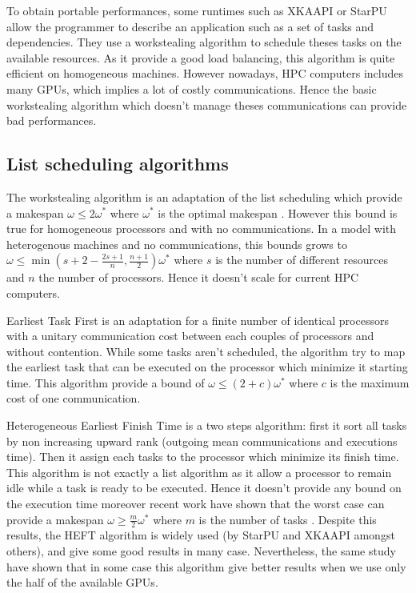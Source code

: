 \documentclass[10pt, conference, compsocconf,pdftex,usenames,dvipsnames]{IEEEtran}
\begin{document}
To obtain portable performances, some runtimes such as XKAAPI
\cite{gautierxkaapi} or StarPU \cite{augonnet2011starpu} allow the programmer
to describe an application such as a set of tasks and dependencies.  They use
a workstealing algorithm \cite{blumofe1995cilk} to schedule theses tasks on
the available resources. As it provide a good load balancing, this algorithm
is quite efficient on homogeneous machines. However nowadays, HPC computers
includes many GPUs, which implies a lot of costly communications. Hence the
basic workstealing algorithm which doesn't manage theses communications can
provide bad performances.

\subsection{List scheduling algorithms}

The workstealing algorithm is an adaptation of the list scheduling which
provide a makespan $\omega\leq2\omega^*$ where $\omega^*$ is the optimal
makespan \cite{GrahamRL1966Bounds, GrahamRL1969Bounds}. However this bound is
true for homogeneous processors and with no communications. In a model with
heterogenous machines and no communications, this bounds grows to
$\omega\leq\min(s+2-\frac{2s+1}{n},\frac{n+1}{2})\omega^*$ where $s$ is the
number of different resources and $n$ the number of processors. Hence it
doesn't scale for current HPC computers. 

Earliest Task First\cite{hwang1989scheduling} is an adaptation for a finite
number of identical processors with a unitary communication cost between each
couples of processors and without contention. While some tasks aren't
scheduled, the algorithm try to map the earliest task that can be executed on
the processor which minimize it starting time. This algorithm provide a bound
of $\omega\leq(2+c)\omega^*$ where $c$ is the maximum cost of one
communication.  

Heterogeneous Earliest Finish Time \cite{topcuoglu2002performance}  is a two
steps algorithm: first it sort all tasks by non increasing upward rank
(outgoing mean communications and executions time). Then it assign each tasks
to the processor which minimize its finish time. This algorithm is not exactly
a list algorithm as it allow a processor to remain idle while a task is ready
to be executed.  Hence it doesn't provide any bound on the execution time
moreover recent work have shown that the worst case can provide a makespan
$\omega \geq \frac{m}{2}\omega^*$ where $m$ is the number of tasks
\cite{Kedad-SidhoumMonnaMounieEtAl2013}. Despite this results, the HEFT
algorithm is widely used (by StarPU and XKAAPI amongst others), and give some
good results in many case\cite{ferreiralima:hal-00735470}. Nevertheless, the
same study have shown that in some case this algorithm give better results
when we use only the half of the available GPUs.
\end{document}

